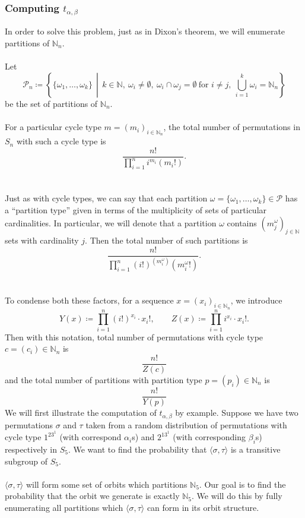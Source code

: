 \subsubsection{Computing $t_{\alpha, \beta}$}
In order to solve this problem, just as in Dixon's theorem, we will enumerate partitions of $\mathbb{N}_n$. \\\\Let
\[
\mathcal{P}_n \coloneqq \left\{ \{ \omega_1, \dots, \omega_k \} \,\middle|\, k \in \mathbb{N},\ \omega_i \neq \emptyset,\ \omega_i \cap \omega_j = \emptyset\ \text{for } i \neq j,\ \bigcup_{i=1}^k \omega_i = \mathbb{N}_n \right\}
\]be the set of partitions of \( \mathbb{N}_n \). 
\\\\For a particular cycle type $m = (m_i)_{i\in\mathbb{N}_n}$, the total number of permutations in $S_n$ with such a cycle type is 
\[
    \frac{n!}{\prod_{i=1}^ni^{m_i}(m_i!)}.
\]
\\\\Just as with cycle types, we can say that each partition $\omega = \{\omega_1,\dots, \omega_k\}\in\mathcal{P}$ has a ``partition type'' given in terms of the multiplicity of sets of particular cardinalities. In particular, we will denote that a partition $\omega$ contains $(m_j^{\omega})_{j\in\mathbb{N}}$ sets with cardinality $j$. Then the total number of such partitions is 
\[
    \frac{n!}{\prod_{i=1}^n(i!)^{(m_i^{\omega})}(m_i^{\omega}!)}.
\]
\\\\To condense both these factors, for a sequence $x = (x_i)_{i\in\mathbb{N}_n}$, we introduce
\[
Y(x) \coloneqq \prod_{i=1}^n (i!)^{x_i} \cdot x_i!, \qquad
Z(x) \coloneqq \prod_{i=1}^n i^{x_i} \cdot x_i!.
\]
Then with this notation, total number of permutations with cycle type $c = (c_i)\in\mathbb{N}_n$ is 
\[
    \frac{n!}{Z(c)}
\]
and the total number of partitions with partition type $p = (p_i)\in\mathbb{N}_n$ is 
\[
    \frac{n!}{Y(p)}
\]
We will first illustrate the computation of $t_{\alpha,\beta}$ by example. Suppose we have two permutations $\sigma$ and $\tau$ taken from a random distribution of permutations with cycle type $1^23^1$ (with correspond $\alpha_i$s)  and $2^13^1$ (with corresponding $\beta_i$s) respectively in $S_5$. We want to find the probability that $\langle \sigma, \tau \rangle$ is a transitive subgroup of $S_5$.
\\\\$\langle \sigma, \tau \rangle$ will form some set of orbits which partitions $\mathbb{N}_5$. Our goal is to find the probability that the orbit we generate is exactly $\mathbb{N}_5$. We will do this by fully enumerating all partitions which $\langle \sigma, \tau \rangle$ can form in its orbit structure.
